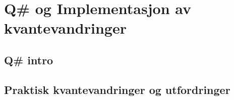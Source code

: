 \section{Q\# og Implementasjon av kvantevandringer}

\subsection{Q\# intro}
\lipsum[12]

\subsection{Praktisk kvantevandringer og utfordringer}

\lipsum[13]
\lipsum[14]